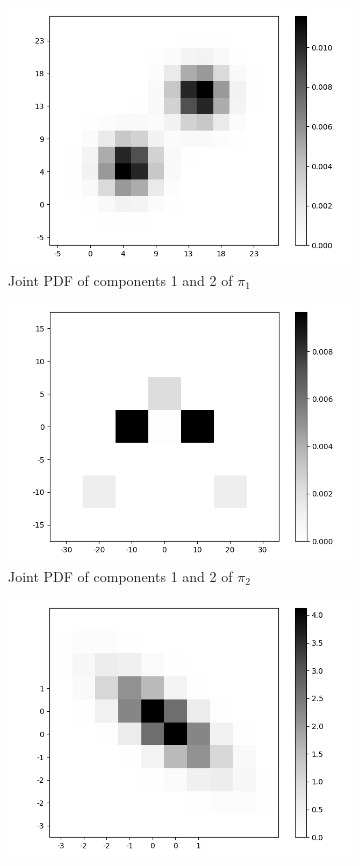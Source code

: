 \documentclass{scrartcl}
\begin{document}
    \begin{figure}
        \centering
        \begin{subfigure}{.45\textwidth}
              \centering
              \includegraphics[width=.8\linewidth]{../figs/fig_3_pi_1.png}
              \caption{Joint PDF of components 1 and 2 of $\pi_1$}
              \label{target_distributions_pi_1}
        \end{subfigure}
        \begin{subfigure}{.45\textwidth}
              \centering
              \includegraphics[width=.8\linewidth]{../figs/fig_3_pi_2.png}
              \caption{Joint PDF of components 1 and 2 of $\pi_2$}
              \label{target_distributions_pi_2}
        \end{subfigure}
        \begin{subfigure}{.45\textwidth}
              \centering
              \includegraphics[width=.8\linewidth]{../figs/fig_3_pi_3.png}

\end{subfigure}
\end{figure}
\end{document}
